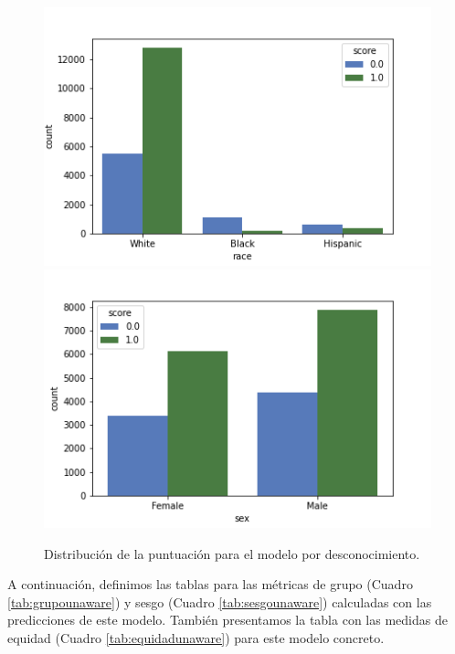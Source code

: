 \documentclass[oneside,openright,titlepage,numbers=noenddot,openany,headinclude,footinclude=true,
cleardoublepage=empty,abstractoff,BCOR=5mm,paper=a4,fontsize=12pt,main=spanish]{scrreprt}
\begin{document}
\begin{figure}[H]
      \includegraphics[width=\linewidth]{images/score_unaware_race_law.png}
    \endminipage\hfill
      \includegraphics[width=\linewidth]{images/score_unaware_sex_law.png}
    \endminipage
     \caption{Distribución de la puntuación para el modelo por desconocimiento.}
     \label{fig:scoreunaware}
\end{figure}

A continuación, definimos las tablas para las métricas de grupo (Cuadro \ref{tab:grupounaware}) y sesgo (Cuadro \ref{tab:sesgounaware}) calculadas con las predicciones de este modelo. También presentamos la tabla con las medidas de equidad (Cuadro \ref{tab:equidadunaware}) para este modelo concreto.\\
\end{document}
